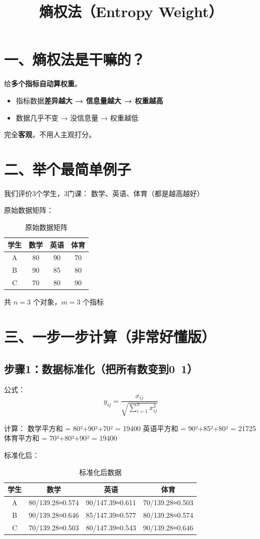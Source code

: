 \documentclass{article}
\title{熵权法（Entropy Weight）}
\author{}
\date{}
\begin{document}
\maketitle

\section{一、熵权法是干嘛的？}
给\textbf{多个指标自动算权重}。
\begin{itemize}
    \item 指标数据\textbf{差异越大 → 信息量越大 → 权重越高}
    \item 数据几乎不变 → 没信息量 → 权重越低
\end{itemize}

完全\textbf{客观}，不用人主观打分。

\section{二、举个最简单例子}
我们评价3个学生，3门课：
数学、英语、体育（都是越高越好）

原始数据矩阵：
\begin{table}[ht]
    \centering
    \begin{tabular}{|c|c|c|c|}
        \hline
        学生 & 数学 & 英语 & 体育 \\
        \hline
        A & 80 & 90 & 70 \\
        B & 90 & 85 & 80 \\
        C & 70 & 80 & 90 \\
        \hline
    \end{tabular}
    \caption{原始数据矩阵}
\end{table}

共 $n=3$ 个对象，$m=3$ 个指标

\section{三、一步一步计算（非常好懂版）}

\subsection{步骤1：数据标准化（把所有数变到0~1）}
公式：
\[ y_{ij}=\frac{x_{ij}}{\sqrt{\sum_{i=1}^n x_{ij}^2}} \]

计算：
数学平方和 = 80²+90²+70² = 19400
英语平方和 = 90²+85²+80² = 21725
体育平方和 = 70²+80²+90² = 19400

标准化后：
\begin{table}[ht]
    \centering
    \begin{tabular}{|c|c|c|c|}
        \hline
        学生 & 数学 & 英语 & 体育 \\
        \hline
        A & 80/139.28≈0.574 & 90/147.39≈0.611 & 70/139.28≈0.503 \\
        B & 90/139.28≈0.646 & 85/147.39≈0.577 & 80/139.28≈0.574 \\
        C & 70/139.28≈0.503 & 80/147.39≈0.543 & 90/139.28≈0.646 \\
        \hline
    \end{tabular}
    \caption{标准化后数据}
\end{table}
\end{document}
